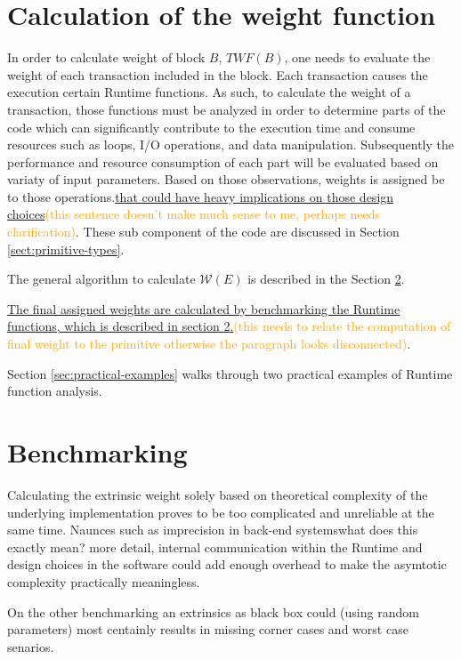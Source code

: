 \documentclass[11pt,a4paper]{article}
\newcommand{\syed}[2]{{\underline{#1}}\textcolor{orange}{(#2)}}
\newcommand{\TWF}{\ensuremath{\mathcal{W}}}
\begin{document}
\section{Calculation of the weight function}
\label{sec:runtime-primitives}
In order to calculate weight of block $B$, $TWF(B)$, one needs to evaluate the weight of each transaction included in the block. Each transaction causes the execution certain Runtime functions. As such, to calculate the weight of a transaction, those functions must be analyzed in order to determine parts of the code which can significantly contribute to the execution time and consume resources such as  loops, I/O operations, and data manipulation. Subsequently the performance and resource consumption of each part will be evaluated based on variaty of input parameters. Based on those observations, weights is assigned be to those operations.\syed{that could have heavy implications on those design choices}{this sentence doesn't make much sense to me, perhaps needs clarification}. These sub component of the code are discussed in Section \ref{sect:primitive-types}.

The general algorithm to calculate $\TWF(E)$ is described in the Section \ref{sect:benchmarking}.

\syed{The final assigned weights are calculated by benchmarking the Runtime functions, which is described in section \ref{sect:benchmarking}.}{this needs to relate the computation of final weight to the primitive otherwise the paragraph looks disconnected}.
\newline

Section \ref{sec:practical-examples} walks through two practical examples of Runtime function analysis.

\section{Benchmarking}\label{sect:benchmarking}
Calculating the extrinsic weight solely based on theoretical complexity of the underlying implementation proves to be too complicated and unreliable at the same time. Naunces such as {imprecision in back-end systems}{what does this exactly mean? more detail}, internal communication within the Runtime and design choices in the software could add enough overhead to make the asymtotic complexity practically meaningless.

On the other benchmarking an extrinsics as black box could (using random parameters) most centainly results in missing corner cases and worst case senarios.
\end{document}
